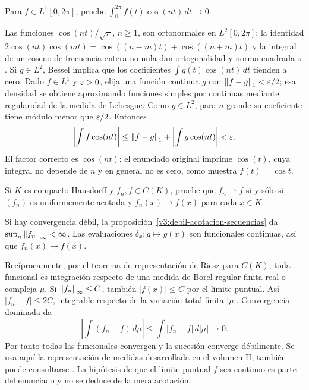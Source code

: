 \begin{ejercicio}\label{ej:v3-l15-1}
Para $f\in L^1[0,2\pi]$, pruebe $\int_0^{2\pi}f(t)\cos(nt)\,dt\to0$.
\end{ejercicio}
\begin{solucion}
Las funciones $\cos(nt)/\sqrt\pi$, $n\ge1$, son ortonormales en $L^2[0,2\pi]$: la identidad $2\cos(nt)\cos(mt)=\cos((n-m)t)+\cos((n+m)t)$ y la integral de un coseno de frecuencia entera no nula dan ortogonalidad y norma cuadrada $\pi$. Si $g\in L^2$, Bessel implica que los coeficientes $\int g(t)\cos(nt)\,dt$ tienden a cero. Dado $f\in L^1$ y $\varepsilon>0$, elija una función continua $g$ con $\left\lVert f-g\right\rVert_1<\varepsilon/2$; esa densidad se obtiene aproximando funciones simples por continuas mediante regularidad de la medida de Lebesgue. Como $g\in L^2$, para $n$ grande su coeficiente tiene módulo menor que $\varepsilon/2$. Entonces
\[\left|\int f\cos(nt)\right|\le\left\lVert f-g\right\rVert_1+\left|\int g\cos(nt)\right|<\varepsilon.
\]
El factor correcto es $\cos(nt)$; el enunciado original imprime $\cos(t)$, cuya integral no depende de $n$ y en general no es cero, como muestra $f(t)=\cos t$.
\end{solucion}

\begin{ejercicio}\label{ej:v3-l15-2}
Si $K$ es compacto Hausdorff y $f_n,f\in C(K)$, pruebe que $f_n\rightharpoonup f$ si y sólo si $(f_n)$ es uniformemente acotada y $f_n(x)\to f(x)$ para cada $x\in K$.
\end{ejercicio}
\begin{solucion}
Si hay convergencia débil, la proposición~\ref{v3:debil-acotacion-secuencias} da $\sup_n\left\lVert f_n\right\rVert_\infty<\infty$. Las evaluaciones $\delta_x:g\mapsto g(x)$ son funcionales continuas, así que $f_n(x)\to f(x)$.

Recíprocamente, por el teorema de representación de Riesz para $C(K)$, toda funcional es integración respecto de una medida de Borel regular finita real o compleja $\mu$. Si $\left\lVert f_n\right\rVert_\infty\le C$, también $|f(x)|\le C$ por el límite puntual. Así $|f_n-f|\le2C$, integrable respecto de la variación total finita $|\mu|$. Convergencia dominada da
\[\left|\int(f_n-f)\,d\mu\right|\le\int|f_n-f|\,d|\mu|\longrightarrow0.
\]
Por tanto todas las funcionales convergen y la sucesión converge débilmente. Se usa aquí la representación de medidas desarrollada en el volumen II; también puede consultarse \cite{rudin1991}. La hipótesis de que el límite puntual $f$ sea continuo es parte del enunciado y no se deduce de la mera acotación.
\end{solucion}

